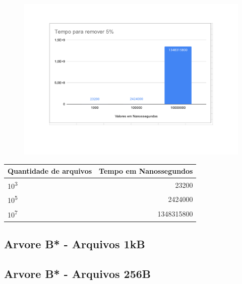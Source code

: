 \begin{figure}[ht]
    \centering
    \includegraphics[scale=0.6]{Trabalho AED/fig/Planilha sem título - Página8.pdf}
    \label{fig:my_label}
\end{figure}
 \begin{center}
        \begin{tabular}{| l | r |}
            \hline
            Quantidade de arquivos & Tempo em Nanossegundos\\
            \hline
            10\textsuperscript{3} & 23200 \\
            10\textsuperscript{5} & 2424000\\
            10\textsuperscript{7} &  1348315800 \\
            \hline
        \end{tabular}
    \end{center}
\subsection{Arvore B* - Arquivos 1kB}

\subsection{Arvore B* - Arquivos 256B}